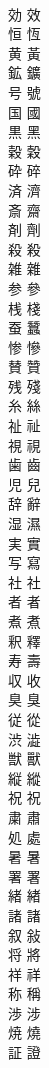 \documentclass[8pt]{extreport}
\begin{document}
\begin{CJK}{UTF8}{min}
\\	効	效
\\	恒	恆
\\	黄	黃
\\	鉱	鑛
\\	号	號
\\	国	國
\\	黒	黑
\\	穀	穀
\\	砕	碎
\\	済	濟
\\	斎	齋
\\	剤	劑
\\	殺	殺
\\	雑	雜
\\	参	參
\\	桟	棧
\\	蚕	蠶
\\	惨	慘
\\	賛	贊
\\	残	殘
\\	糸	絲
\\	祉	祉
\\	視	視
\\	歯	齒
\\	児	兒
\\	辞	辭
\\	湿	濕
\\	実	實
\\	写	寫
\\	社	社
\\	者	者
\\	煮	煮
\\	釈	釋
\\	寿	壽
\\	収	收
\\	臭	臭
\\	従	從
\\	渋	澁
\\	獣	獸
\\	縦	縱
\\	祝	祝
\\	粛	肅
\\	処	處
\\	暑	暑
\\	署	署
\\	緒	緖
\\	諸	諸
\\	叙	敍
\\	将	將
\\	祥	祥
\\	称	稱
\\	渉	涉
\\	焼	燒
\\	証	證

\end{CJK}
\end{document}
